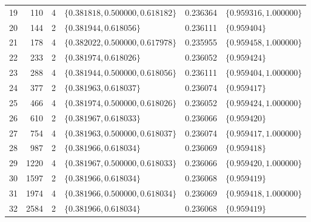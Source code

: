 \begin{table}[H]
\begin{tabular}{r r r l r l}
19 & 110 & 4 & $\{0.381818, 0.500000, 0.618182\}$ & 0.236364 & $\{0.959316, 1.000000\}$\\
20 & 144 & 2 & $\{0.381944, 0.618056\}$ & 0.236111 & $\{0.959404\}$\\
21 & 178 & 4 & $\{0.382022, 0.500000, 0.617978\}$ & 0.235955 & $\{0.959458, 1.000000\}$\\
22 & 233 & 2 & $\{0.381974, 0.618026\}$ & 0.236052 & $\{0.959424\}$\\
23 & 288 & 4 & $\{0.381944, 0.500000, 0.618056\}$ & 0.236111 & $\{0.959404, 1.000000\}$\\
24 & 377 & 2 & $\{0.381963, 0.618037\}$ & 0.236074 & $\{0.959417\}$\\
25 & 466 & 4 & $\{0.381974, 0.500000, 0.618026\}$ & 0.236052 & $\{0.959424, 1.000000\}$\\
26 & 610 & 2 & $\{0.381967, 0.618033\}$ & 0.236066 & $\{0.959420\}$\\
27 & 754 & 4 & $\{0.381963, 0.500000, 0.618037\}$ & 0.236074 & $\{0.959417, 1.000000\}$\\
28 & 987 & 2 & $\{0.381966, 0.618034\}$ & 0.236069 & $\{0.959418\}$\\
29 & 1220 & 4 & $\{0.381967, 0.500000, 0.618033\}$ & 0.236066 & $\{0.959420, 1.000000\}$\\
30 & 1597 & 2 & $\{0.381966, 0.618034\}$ & 0.236068 & $\{0.959419\}$\\
31 & 1974 & 4 & $\{0.381966, 0.500000, 0.618034\}$ & 0.236069 & $\{0.959418, 1.000000\}$\\
32 & 2584 & 2 & $\{0.381966, 0.618034\}$ & 0.236068 & $\{0.959419\}$\\
\bottomrule
\end{tabular}
\end{table}
